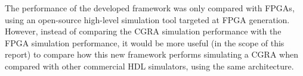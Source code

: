 The performance of the developed framework was only compared with FPGAs, using
an open-source high-level simulation tool targeted at FPGA generation.
However, instead of comparing the CGRA simulation performance with the FPGA
simulation
performance, it would be more useful (in the scope of this report) to compare
how this new framework performs simulating a CGRA when compared with other
commercial HDL simulators, using the same architecture.
